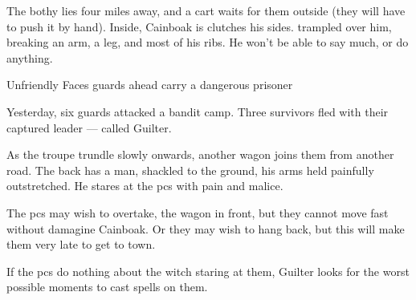 \documentclass[10pt,twoside]{book}
\begin{document}
The \gls{bothy} lies four miles away, and a cart waits for them outside (they will have to push it by hand).
Inside, Cainboak is clutches his sides.
 trampled over him, breaking an arm, a leg, and most of his ribs.
He won't be able to say much, or do anything.

{Unfriendly Faces}%
{\Glspl{guard} ahead carry a dangerous prisoner}%

\begin{exampletext}
  Yesterday, six \glspl{guard} attacked a bandit camp.
  Three survivors fled with their captured leader ---  called Guilter.
\end{exampletext}

As the troupe trundle slowly onwards, another wagon joins them from another road.
The back has a man, shackled to the ground, his arms held painfully outstretched.
He stares at the \glspl{pc} with pain and malice.

The \glspl{pc} may wish to overtake, the wagon in front, but they cannot move fast without damagine Cainboak.
Or they may wish to hang back, but this will make them very late to get to town.


\showStdSpells

If the \glspl{pc} do nothing about the \gls{witch} staring at them, Guilter looks for the worst possible moments to cast spells on them.
\end{document}
